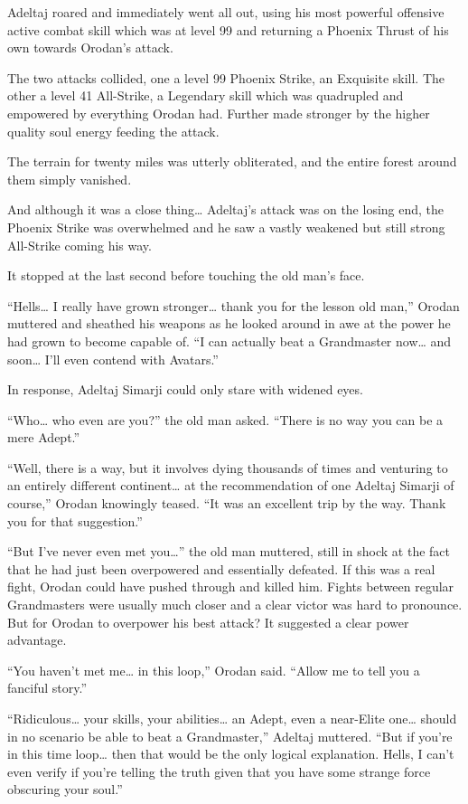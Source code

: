 \documentclass[a4paper,10pt]{book}
\begin{document}
Adeltaj roared and immediately went all out, using his most powerful offensive active combat skill which was at level 99 and returning a Phoenix Thrust of his own towards Orodan’s attack.\par
The two attacks collided, one a level 99 Phoenix Strike, an Exquisite skill. The other a level 41 All-Strike, a Legendary skill which was quadrupled and empowered by everything Orodan had. Further made stronger by the higher quality soul energy feeding the attack.\par
The terrain for twenty miles was utterly obliterated, and the entire forest around them simply vanished.\par
And although it was a close thing… Adeltaj’s attack was on the losing end, the Phoenix Strike was overwhelmed and he saw a vastly weakened but still strong All-Strike coming his way.\par
It stopped at the last second before touching the old man’s face.\par
“Hells… I really have grown stronger… thank you for the lesson old man,” Orodan muttered and sheathed his weapons as he looked around in awe at the power he had grown to become capable of. “I can actually beat a Grandmaster now… and soon… I’ll even contend with Avatars.”\par
In response, Adeltaj Simarji could only stare with widened eyes.\par
“Who… who even are you?” the old man asked. “There is no way you can be a mere Adept.”\par
“Well, there is a way, but it involves dying thousands of times and venturing to an entirely different continent… at the recommendation of one Adeltaj Simarji of course,” Orodan knowingly teased. “It was an excellent trip by the way. Thank you for that suggestion.”\par
“But I’ve never even met you…” the old man muttered, still in shock at the fact that he had just been overpowered and essentially defeated. If this was a real fight, Orodan could have pushed through and killed him. Fights between regular Grandmasters were usually much closer and a clear victor was hard to pronounce. But for Orodan to overpower his best attack? It suggested a clear power advantage.\par
“You haven’t met me… in this loop,” Orodan said. “Allow me to tell you a fanciful story.”\par
\par
“Ridiculous… your skills, your abilities… an Adept, even a near-Elite one… should in no scenario be able to beat a Grandmaster,” Adeltaj muttered. “But if you’re in this time loop… then that would be the only logical explanation. Hells, I can’t even verify if you’re telling the truth given that you have some strange force obscuring your soul.”\par
\end{document}
